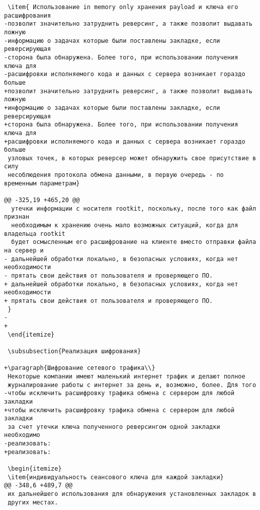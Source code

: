 \begin{verbatim}
 \item{ Использование in memory only хранения payload и ключа его расшифрования
-позволит значительно затруднить реверсинг, а также позволит выдавать ложную
-информацию о задачах которые были поставлены закладке, если реверсирующая
-сторона была обнаружена. Более того, при использовании получения ключа для
-расшифровки исполняемого кода и данных с сервера возникает гораздо больше
+позволит значительно затруднить реверсинг, а также позволит выдавать ложную
+информацию о задачах которые были поставлены закладке, если реверсирующая
+сторона была обнаружена. Более того, при использовании получения ключа для
+расшифровки исполняемого кода и данных с сервера возникает гораздо больше
 узловых точек, в которых реверсер может обнаружить свое присутствие в силу
 несоблюдения протокола обмена данными, в первую очередь - по временным параметрам}

@@ -325,19 +465,20 @@
  утечки информации с носителя rootkit, поскольку, после того как файл признан
  необходимым к хранению очень мало возможных ситуаций, когда для владельца rootkit
  будет осмысленным его расшифрование на клиенте вместо отправки файла на сервер и
- дальнейшей обработки локально, в безопасных условиях, когда нет необходимости
- прятать свои действия от пользователя и проверяющего ПО.
+ дальнейшей обработки локально, в безопасных условиях, когда нет необходимости
+ прятать свои действия от пользователя и проверяющего ПО.
 }
-
+
 \end{itemize}

 \subsubsection{Реализация шифрования}

+\paragraph{Шифрование сетевого трафика\\}
 Некоторые компании имеют маленький интернет трафик и делают полное
 журналирование работы с интернет за день и, возможно, более. Для того
-чтобы исключить расшифровку трафика обмена с сервером для любой закладки
+чтобы исключить расшифровку трафика обмена с сервером для любой закладки
 за счет утечки ключа полученного реверсингом одной закладки необходимо
-реализовать:
+реализовать:

 \begin{itemize}
 \item{индивидуальность сеансового ключа для каждой закладки}
@@ -348,6 +489,7 @@
 их дальнейшего использования для обнаружения установленных закладок в
 других местах.


\end{verbatim}
